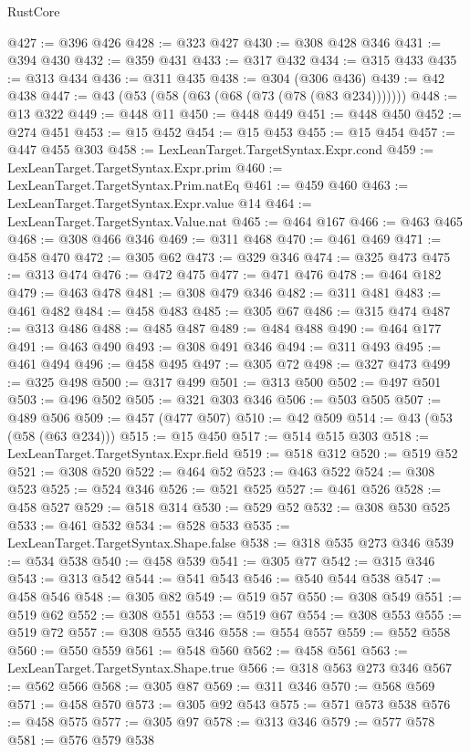 \begin{lexlean}{RustCore}
\begin{coremodule}
@427 := @396 @426
@428 := @323 @427
@430 := @308 @428 @346
@431 := @394 @430
@432 := @359 @431
@433 := @317 @432
@434 := @315 @433
@435 := @313 @434
@436 := @311 @435
@438 := @304 (@306 @436)
@439 := @42 @438
@447 := @43 (@53 (@58 (@63 (@68 (@73 (@78 (@83 @234)))))))
@448 := @13 @322
@449 := @448 @11
@450 := @448 @449
@451 := @448 @450
@452 := @274 @451
@453 := @15 @452
@454 := @15 @453
@455 := @15 @454
@457 := @447 @455 @303
@458 := LexLeanTarget.TargetSyntax.Expr.cond
@459 := LexLeanTarget.TargetSyntax.Expr.prim
@460 := LexLeanTarget.TargetSyntax.Prim.natEq
@461 := @459 @460
@463 := LexLeanTarget.TargetSyntax.Expr.value @14
@464 := LexLeanTarget.TargetSyntax.Value.nat
@465 := @464 @167
@466 := @463 @465
@468 := @308 @466 @346
@469 := @311 @468
@470 := @461 @469
@471 := @458 @470
@472 := @305 @62
@473 := @329 @346
@474 := @325 @473
@475 := @313 @474
@476 := @472 @475
@477 := @471 @476
@478 := @464 @182
@479 := @463 @478
@481 := @308 @479 @346
@482 := @311 @481
@483 := @461 @482
@484 := @458 @483
@485 := @305 @67
@486 := @315 @474
@487 := @313 @486
@488 := @485 @487
@489 := @484 @488
@490 := @464 @177
@491 := @463 @490
@493 := @308 @491 @346
@494 := @311 @493
@495 := @461 @494
@496 := @458 @495
@497 := @305 @72
@498 := @327 @473
@499 := @325 @498
@500 := @317 @499
@501 := @313 @500
@502 := @497 @501
@503 := @496 @502
@505 := @321 @303 @346
@506 := @503 @505
@507 := @489 @506
@509 := @457 (@477 @507)
@510 := @42 @509
@514 := @43 (@53 (@58 (@63 @234)))
@515 := @15 @450
@517 := @514 @515 @303
@518 := LexLeanTarget.TargetSyntax.Expr.field
@519 := @518 @312
@520 := @519 @52
@521 := @308 @520
@522 := @464 @52
@523 := @463 @522
@524 := @308 @523
@525 := @524 @346
@526 := @521 @525
@527 := @461 @526
@528 := @458 @527
@529 := @518 @314
@530 := @529 @52
@532 := @308 @530 @525
@533 := @461 @532
@534 := @528 @533
@535 := LexLeanTarget.TargetSyntax.Shape.false
@538 := @318 @535 @273 @346
@539 := @534 @538
@540 := @458 @539
@541 := @305 @77
@542 := @315 @346
@543 := @313 @542
@544 := @541 @543
@546 := @540 @544 @538
@547 := @458 @546
@548 := @305 @82
@549 := @519 @57
@550 := @308 @549
@551 := @519 @62
@552 := @308 @551
@553 := @519 @67
@554 := @308 @553
@555 := @519 @72
@557 := @308 @555 @346
@558 := @554 @557
@559 := @552 @558
@560 := @550 @559
@561 := @548 @560
@562 := @458 @561
@563 := LexLeanTarget.TargetSyntax.Shape.true
@566 := @318 @563 @273 @346
@567 := @562 @566
@568 := @305 @87
@569 := @311 @346
@570 := @568 @569
@571 := @458 @570
@573 := @305 @92 @543
@575 := @571 @573 @538
@576 := @458 @575
@577 := @305 @97
@578 := @313 @346
@579 := @577 @578
@581 := @576 @579 @538

\end{coremodule}
\end{lexlean}
